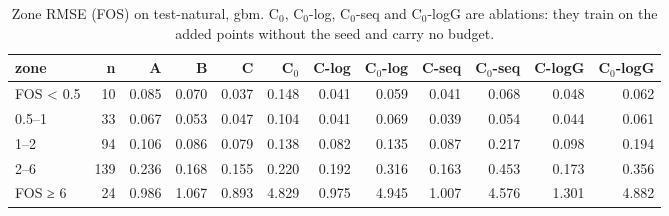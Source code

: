 \begin{table}[htbp]
\centering
\small
\setlength{\tabcolsep}{4pt}
\caption{Zone RMSE (FOS) on test-natural, gbm. C$_0$, C$_0$-log, C$_0$-seq and C$_0$-logG are ablations: they train on the added points without the seed and carry no budget.}
\label{tab:test-natural__fos-rmse:zones:gbm}
\begin{tabular}{lrrrrrrrrrrr}
\toprule
zone & n & A & B & C & C$_0$ & C-log & C$_0$-log & C-seq & C$_0$-seq & C-logG & C$_0$-logG \\
\midrule
FOS < 0.5 & 10 & 0.085 & 0.070 & 0.037 & 0.148 & 0.041 & 0.059 & 0.041 & 0.068 & 0.048 & 0.062 \\
0.5–1 & 33 & 0.067 & 0.053 & 0.047 & 0.104 & 0.041 & 0.069 & 0.039 & 0.054 & 0.044 & 0.061 \\
1–2 & 94 & 0.106 & 0.086 & 0.079 & 0.138 & 0.082 & 0.135 & 0.087 & 0.217 & 0.098 & 0.194 \\
2–6 & 139 & 0.236 & 0.168 & 0.155 & 0.220 & 0.192 & 0.316 & 0.163 & 0.453 & 0.173 & 0.356 \\
FOS ≥ 6 & 24 & 0.986 & 1.067 & 0.893 & 4.829 & 0.975 & 4.945 & 1.007 & 4.576 & 1.301 & 4.882 \\
\bottomrule
\end{tabular}
\end{table}
